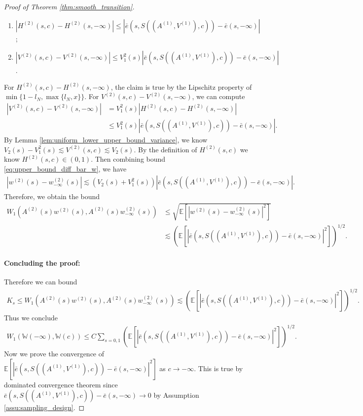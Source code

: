 \documentclass[12pt]{article}
\newcommand{\E}{\mathbb E}								%
\begin{document}
\begin{proof}[Proof of Theorem \ref{thm:smooth_transition}]
\begin{enumerate}
		\item $|H^{(2)}(s,c)-H^{(2)}(s,-\infty)|\leq |\bar e(s, S((A^{(1)},V^{(1)}),c))-\bar e(s, -\infty)|$;
		\item $|V^{(2)}(s,c)-V^{(2)}(s,-\infty)|\leq V_1^2(s)|\bar e(s, S((A^{(1)},V^{(1)}),c))-\bar e(s, -\infty)|$.
	\end{enumerate}
	For $H^{(2)}(s,c)-H^{(2)}(s,-\infty)$, the claim is true by the Lipschitz property of $\min\{1-l_N,\max\{l_N,x\}\}$. For $V^{(2)}(s,c)-V^{(2)}(s,-\infty)$, we can compute 
	\begin{align*}
		|V^{(2)}(s,c)-V^{(2)}(s,-\infty)|
		&
		=V_1^2(s)|H^{(2)}(s,c)-H^{(2)}(s,-\infty)|\\
		&
		\leq V_1^2(s)|\bar e(s, S((A^{(1)},V^{(1)}),c))-\bar e(s, -\infty)|.
	\end{align*}
	By Lemma \ref{lem:uniform_lower_upper_bound_variance}, we know $V_2(s)-V_1^2(s)\lesssim V^{(2)}(s,c)\lesssim V_2(s)$. By the definition of $H^{(2)}(s,c)$ we know $H^{(2)}(s,c)\in(0,1)$. Then combining bound \eqref{eq:upper_bound_diff_bar_w}, we have 
	\begin{align*}
		\left|w^{(2)}(s)-w_{-\infty}^{(2)}(s)\right|\lesssim (V_2(s)+V_1^2(s))|\bar e(s, S((A^{(1)},V^{(1)}),c))-\bar e(s, -\infty)|.
	\end{align*}
	Therefore, we obtain the bound 
	\begin{align*}
		W_1(A^{(2)}(s) w^{(2)}(s),A^{(2)}(s) w_{-\infty}^{(2)}(s))
		&
		\leq \sqrt{\E[|w^{(2)}(s)- w_{-\infty}^{(2)}(s)|^2]}\\
		&
		\lesssim \left(\E[|\bar e(s, S((A^{(1)},V^{(1)}),c))-\bar e(s, -\infty)|^2]\right)^{1/2}.
	\end{align*}

	\paragraph{Concluding the proof:}

	Therefore we can bound 
	\begin{align*}
		K_s\leq W_1(A^{(2)}(s) w^{(2)}(s),A^{(2)}(s) w_{-\infty}^{(2)}(s))\lesssim \left(\E[|\bar e(s, S((A^{(1)},V^{(1)}),c))-\bar e(s, -\infty)|^2]\right)^{1/2}.
	\end{align*}
	Thus we conclude 
	\begin{align*}
		W_1(\mathbb{W}(-\infty),\mathbb{W}(c))\leq C\sum_{s=0,1}\left(\E[|\bar e(s, S((A^{(1)},V^{(1)}),c))-\bar e(s, -\infty)|^2]\right)^{1/2}.
	\end{align*}
	Now we prove the convergence of $\E[|\bar e(s, S((A^{(1)},V^{(1)}),c))-\bar e(s, -\infty)|^2]$ as $c\rightarrow-\infty$. This is true by dominated convergence theorem since $\bar e(s, S((A^{(1)},V^{(1)}),c))-\bar e(s, -\infty)\rightarrow0$ by Assumption \ref{assu:sampling_design}.
\end{proof}
\end{document}

